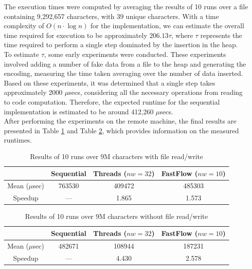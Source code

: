 \documentclass[10pt]{article}
\begin{document}
The execution times were computed by averaging the results of 10 runs over a file containing 9,292,657 characters, with 39 unique characters. With a time complexity of $O(n\cdot\log n)$ for the implementation, we can estimate the overall time required for execution to be approximately $206.13\tau$, where $\tau$ represents the time required to perform a single step dominated by the insertion in the heap.\\
To estimate $\tau$, some early experiments were conducted. These experiments involved adding a number of fake data from a file to the heap and generating the encoding, measuring the time taken averaging over the number of data inserted. Based on these experiments, it was determined that a single step takes approximately 2000 $\mu$secs, considering all the necessary operations from reading to code computation. Therefore, the expected runtime for the sequential implementation is estimated to be around 412,260 $\mu$secs.\\
After performing the experiments on the remote machine, the final results are presented in Table \ref{table:experiments_wfile} and Table \ref{table:experiments_wofile}, which provides information on the measured runtimes.
\begin{table}[H]
\begin{center}
	\begin{tabular}{c || c | c | c}
	& Sequential & Threads ($nw = 32$) & FastFlow ($nw = 10$)\\
	\hline
	Mean ($\mu$sec) & 763530 & 409472 & 485303 \\
	\hline
	Speedup & --- & 1.865 & 1.573
	\end{tabular}
\end{center}
\caption{Results of 10 runs over 9M characters with file read/write}
\label{table:experiments_wfile}
\end{table}
\begin{table}[H]
\begin{center}
	\begin{tabular}{c || c | c | c}
	& Sequential & Threads ($nw = 32$) & FastFlow ($nw = 10$)\\
	\hline
	Mean ($\mu$sec) & 482671 & 108944 & 187231 \\
	\hline
	Speedup & --- & 4.430 & 2.578
	\end{tabular}
\end{center}
\caption{Results of 10 runs over 9M characters without file read/write}
\label{table:experiments_wofile}
\end{table}
\end{document}
